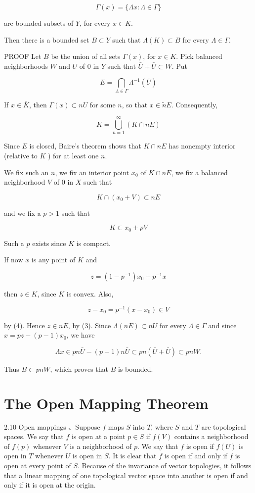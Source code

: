 \documentclass[10pt]{article}
\begin{document}
$$
\Gamma(x)=\{\Lambda x: \Lambda \in \Gamma\}
$$

are bounded subsets of $Y$, for every $x \in K$.

Then there is a bounded set $B \subset Y$ such that $\Lambda(K) \subset B$ for every $\Lambda \in \Gamma$.

PROOF Let $B$ be the union of all sets $\Gamma(x)$, for $x \in K$. Pick balanced neighborhoods $W$ and $U$ of 0 in $Y$ such that $\bar{U}+\bar{U} \subset W$. Put

$$
E=\bigcap_{\Lambda \in \Gamma} \Lambda^{-1}(\bar{U})
$$

If $x \in \bar{K}$, then $\Gamma(x) \subset n U$ for some $n$, so that $x \in \tilde{n} E$. Consequently,

$$
K=\bigcup_{n=1}^{\infty}(K \cap n E)
$$

Since $E$ is closed, Baire's theorem shows that $K \cap n E$ has nonempty interior (relative to $K$ ) for at least one $n$.

We fix such an $n$, we fix an interior point $x_{0}$ of $K \cap n E$, we fix a balanced neighborhood $V$ of 0 in $X$ such that

$$
K \cap\left(x_{0}+V\right) \subset n E
$$

and we fix a $p>1$ such that

$$
K \subset x_{0}+p V
$$

Such a $p$ exists since $K$ is compact.

If now $x$ is any point of $K$ and

$$
z=\left(1-p^{-1}\right) x_{0}+p^{-1} x
$$

then $z \in K$, since $K$ is convex. Also,

$$
z-x_{0}=p^{-1}\left(x-x_{0}\right) \in V
$$

by (4). Hence $z \in n E$, by (3). Since $\Lambda(n E) \subset n \bar{U}$ for every $\Lambda \in \Gamma$ and since $x=p z-(p-1) x_{0}$, we have

$$
\Lambda x \in p n \bar{U}-(p-1) n \bar{U} \subset p n(\bar{U}+\bar{U}) \subset p n W .
$$

Thus $B \subset p n W$, which proves that $B$ is bounded.

\section{The Open Mapping Theorem}
2.10 Open mappings 、Suppose $f$ maps $S$ into $T$, where $S$ and $T$ are topological spaces. We say that $f$ is open at a point $p \in S$ if $f(V)$ contains a neighborhood of
$f(p)$ whenever $V$ is a neighborhood of $p$. We say that $f$ is open if $f(U)$ is open in $T$
whenever $U$ is open in $S$. It is clear that $f$ is open if and only if $f$ is open at every point of $S$. Because of the invariance of vector topologies, it follows that a linear mapping of one topological vector space into another is open if and only if it is open at the origin.
\end{document}
